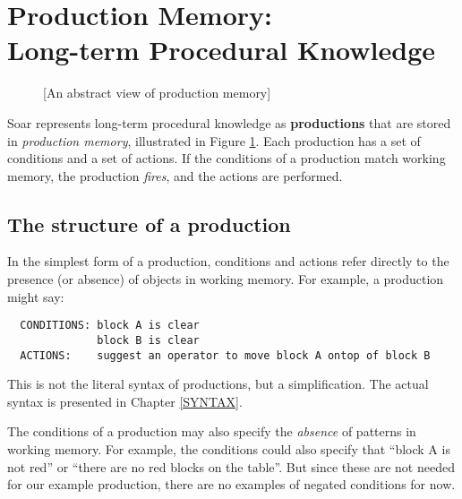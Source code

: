 \section{\texorpdfstring{Production Memory:\\ Long-term Procedural Knowledge}{Production Memory: Long-term Procedural Knowledge}} 
\label{ARCH-pm}

\begin{figure}
	[An abstract view of production memory]
	\label{fig:ab-prodmem}
\end{figure}

Soar represents long-term procedural knowledge as \textbf{productions} that are stored in \emph{production memory}, illustrated in Figure \ref{fig:ab-prodmem}. Each production has a set of conditions and a set of actions.  If the conditions of a production match working memory, the production \emph{fires}, and the actions are performed.

\subsection{The structure of a production}
\label{ARCH-pm-structure}

In the simplest form of a production, conditions and actions refer directly to the presence (or absence) of objects in working memory. For example, a production might say:

\begin{verbatim}
  CONDITIONS: block A is clear 
              block B is clear 
  ACTIONS:    suggest an operator to move block A ontop of block B
\end{verbatim}

This is not the literal syntax of productions, but a simplification. The actual syntax is presented in Chapter \ref{SYNTAX}.

The conditions of a production may also specify the \emph{absence} of patterns in working memory. For example, the conditions could also specify that ``block A is not red'' or ``there are no red blocks on the table''. But since these are not needed for our example production, there are no examples of negated conditions for now.


